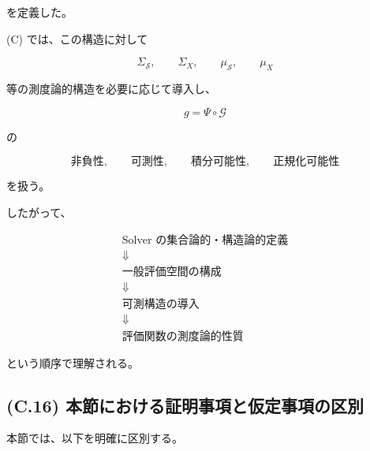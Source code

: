 \documentclass[a4paper,11pt]{article}
\newcommand{\Solver}{\mathcal{S}}
\begin{document}
を定義した。

(C) では、この構造に対して

\begin{equation}
    \Sigma_{\Solver},
    \qquad
    \Sigma_X,
    \qquad
    \mu_{\Solver},
    \qquad
    \mu_X
\end{equation}

等の測度論的構造を必要に応じて導入し、

\begin{equation}
    g
    =
    \Psi\circ\mathcal{G}
\end{equation}

の

\begin{equation}
    \text{非負性},
    \qquad
    \text{可測性},
    \qquad
    \text{積分可能性},
    \qquad
    \text{正規化可能性}
\end{equation}

を扱う。

したがって、

\begin{equation}
    \boxed{
    \begin{array}{c}
        \text{Solver の集合論的・構造論的定義}
        \\[2mm]
        \Downarrow
        \\[2mm]
        \text{一般評価空間の構成}
        \\[2mm]
        \Downarrow
        \\[2mm]
        \text{可測構造の導入}
        \\[2mm]
        \Downarrow
        \\[2mm]
        \text{評価関数の測度論的性質}
    \end{array}
    }
\end{equation}

という順序で理解される。


\subsection{(C.16) 本節における証明事項と仮定事項の区別}
\label{subsec:C16}

本節では、以下を明確に区別する。
\end{document}
